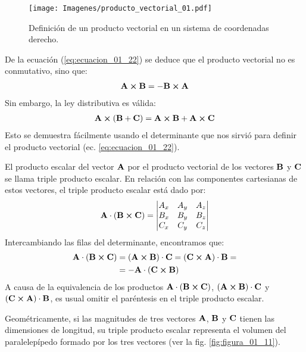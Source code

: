 \documentclass[12pt]{article}
\begin{document}
\begin{figure}[H]
    \centering
    \texttt{[image: Imagenes/producto\_vectorial\_01.pdf]}
    \caption{Definición de un producto vectorial en un sistema de coordenadas derecho.}
    \label{fig:figura_01_10}
\end{figure}
De la ecuación (\ref{eq:ecuacion_01_22}) se deduce que el producto vectorial no es conmutativo, sino que:
\begin{align}
    \vb{A} \cp \vb{B} = - \vb{B} \cp \vb{A}
    \label{eq:ecuacion_01_25}
\end{align} 
Sin embargo, la ley distributiva es válida:
\begin{align}
    \vb{A} \cp \left( \vb{B} + \vb{C} \right) = \vb{A} \cp \vb{B} + \vb{A} \cp \vb{C}
    \label{eq:ecuacion_01_26}   
\end{align}
Esto se demuestra fácilmente usando el determinante que nos sirvió para definir el producto vectorial (ec. \ref{eq:ecuacion_01_22}). 
\par
El producto escalar del vector $\vb{A}$ por el producto vectorial de los vectores $\vb{B}$ y $\vb{C}$ se llama triple producto escalar. En relación con las componentes cartesianas de estos vectores, el triple producto escalar está dado por:
\begin{align}
    \vb{A} \cdot \left( \vb{B} \cp \vb{C} \right) = \mdet{
        A_{x} & A_{y} & A_{z} \\
        B_{x} & B_{y} & B_{z} \\
        C_{x} & C_{y} & C_{z} }
    \label{eq:ecuacion_01_27}
\end{align}
Intercambiando las filas del determinante, encontramos que:
\begin{align}
\begin{aligned}[b]
    \vb{A} \cdot \left( \vb{B} \cp \vb{C} \right) &= \left( \vb{A} \cp \vb{B} \right) \cdot \vb{C} = \left( \vb{C} \cp \vb{A} \right) \cdot \vb{B} = \\
    &= - \vb{A} \cdot \left( \vb{C} \cp \vb{B} \right)
\end{aligned}
\label{eq:ecuacion_01_28}
\end{align}
A causa de la equivalencia de los productos $\vb{A} \cdot \left( \vb{B} \cp \vb{C} \right)$, $\left( \vb{A} \cp \vb{B} \right) \cdot \vb{C}$ y $\left( \vb{C} \cp \vb{A} \right) \cdot \vb{B}$, es usual omitir el paréntesis en el triple producto escalar. 
\par
Geométricamente, si las magnitudes de tres vectores $\vb{A}$, $\vb{B}$ y $\vb{C}$ tienen las dimensiones de longitud, su triple producto escalar representa el volumen del paralelepípedo formado por los tres vectores (ver la fig. \ref{fig:figura_01_11}).
\end{document}
